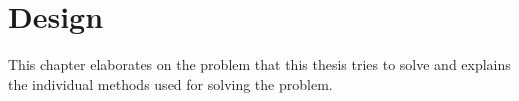 \chapter{Design\label{cha:chapter3}}
This chapter elaborates on the problem that this thesis tries to solve and explains the individual methods used for solving the problem. 
